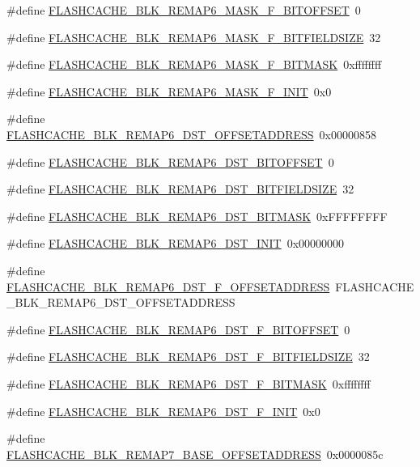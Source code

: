 \begin{DoxyCompactItemize}
\item 
\#define \hyperlink{a00550_a9696c3c1d9ca8a99ea5a7a8b886885a9}{FLASHCACHE\_\-BLK\_\-REMAP6\_\-MASK\_\-F\_\-BITOFFSET}~0
\item 
\#define \hyperlink{a00550_ad77e0fce9c0e0aa1517883fadf7b4b8d}{FLASHCACHE\_\-BLK\_\-REMAP6\_\-MASK\_\-F\_\-BITFIELDSIZE}~32
\item 
\#define \hyperlink{a00550_acc2855586de3d9dd5b61e95c5ca504f6}{FLASHCACHE\_\-BLK\_\-REMAP6\_\-MASK\_\-F\_\-BITMASK}~0xffffffff
\item 
\#define \hyperlink{a00550_a36accd0286c5610e0ee40cf66ded1cb5}{FLASHCACHE\_\-BLK\_\-REMAP6\_\-MASK\_\-F\_\-INIT}~0x0
\item 
\#define \hyperlink{a00550_a10781932ed91e41369a56190164674fb}{FLASHCACHE\_\-BLK\_\-REMAP6\_\-DST\_\-OFFSETADDRESS}~0x00000858
\item 
\#define \hyperlink{a00550_a13d0a9743928956ffb8bdd16fe90d239}{FLASHCACHE\_\-BLK\_\-REMAP6\_\-DST\_\-BITOFFSET}~0
\item 
\#define \hyperlink{a00550_ab82c6456beb42f523812100fb7228e3d}{FLASHCACHE\_\-BLK\_\-REMAP6\_\-DST\_\-BITFIELDSIZE}~32
\item 
\#define \hyperlink{a00550_a13f72fc162568422ebaf58ad583e2505}{FLASHCACHE\_\-BLK\_\-REMAP6\_\-DST\_\-BITMASK}~0xFFFFFFFF
\item 
\#define \hyperlink{a00550_a46baf45a147223aeb3747f18a1caaaa4}{FLASHCACHE\_\-BLK\_\-REMAP6\_\-DST\_\-INIT}~0x00000000
\item 
\#define \hyperlink{a00550_a44720a25dacb9b46bdf3977266db2b80}{FLASHCACHE\_\-BLK\_\-REMAP6\_\-DST\_\-F\_\-OFFSETADDRESS}~FLASHCACHE\_\-BLK\_\-REMAP6\_\-DST\_\-OFFSETADDRESS
\item 
\#define \hyperlink{a00550_aaf11cb2bee66bf08f315e865735db9d7}{FLASHCACHE\_\-BLK\_\-REMAP6\_\-DST\_\-F\_\-BITOFFSET}~0
\item 
\#define \hyperlink{a00550_a7dc7c033b299b82c4736258ae1865f86}{FLASHCACHE\_\-BLK\_\-REMAP6\_\-DST\_\-F\_\-BITFIELDSIZE}~32
\item 
\#define \hyperlink{a00550_a68028f3b7bf6bb17133058cb69ba84f6}{FLASHCACHE\_\-BLK\_\-REMAP6\_\-DST\_\-F\_\-BITMASK}~0xffffffff
\item 
\#define \hyperlink{a00550_ad097f3247908bed8ebf1c53f4434a18c}{FLASHCACHE\_\-BLK\_\-REMAP6\_\-DST\_\-F\_\-INIT}~0x0
\item 
\#define \hyperlink{a00550_a8c5c5a5791d38cc478f623f177edcf2d}{FLASHCACHE\_\-BLK\_\-REMAP7\_\-BASE\_\-OFFSETADDRESS}~0x0000085c
\item 

\end{DoxyCompactItemize}
